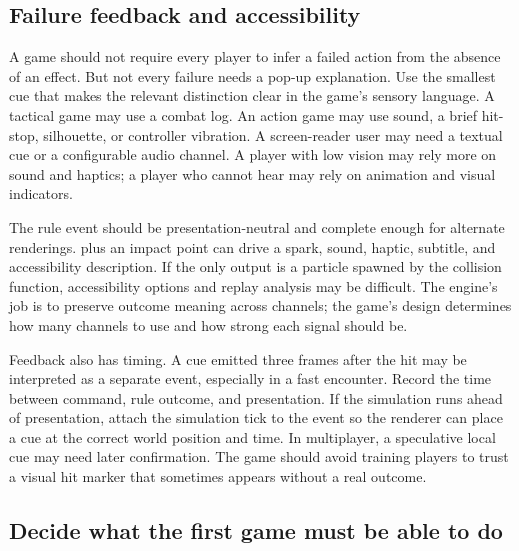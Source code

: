 \subsection{Failure feedback and accessibility}\label{05-engine-i-ch009-failure-feedback-and-accessibility}

\hypertarget{05-engine-i-ch009-failure-feedback-and-accessibility}{}

A game should not require every player to infer a failed action from the absence of an effect. But not every failure needs a pop-up explanation. Use the smallest cue that makes the relevant distinction clear in the game's sensory language. A tactical game may use a combat log. An action game may use sound, a brief hit-stop, silhouette, or controller vibration. A screen-reader user may need a textual cue or a configurable audio channel. A player with low vision may rely more on sound and haptics; a player who cannot hear may rely on animation and visual indicators.

The rule event should be presentation-neutral and complete enough for alternate renderings.  plus an impact point can drive a spark, sound, haptic, subtitle, and accessibility description. If the only output is a particle spawned by the collision function, accessibility options and replay analysis may be difficult. The engine's job is to preserve outcome meaning across channels; the game's design determines how many channels to use and how strong each signal should be.

Feedback also has timing. A cue emitted three frames after the hit may be interpreted as a separate event, especially in a fast encounter. Record the time between command, rule outcome, and presentation. If the simulation runs ahead of presentation, attach the simulation tick to the event so the renderer can place a cue at the correct world position and time. In multiplayer, a speculative local cue may need later confirmation. The game should avoid training players to trust a visual hit marker that sometimes appears without a real outcome.

\subsection{Decide what the first game must be able to do}\label{05-engine-i-ch009-decide-what-the-first-game-must-be-able-to-do}

\hypertarget{05-engine-i-ch009-decide-what-the-first-game-must-be-able-to-do}{}

